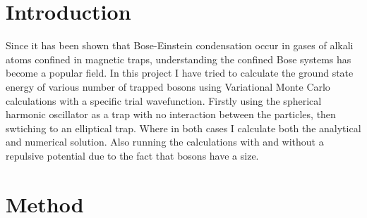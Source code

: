 \documentclass[12pt]{article}
\begin{document}
  \section{Introduction}
  Since it has been shown that Bose-Einstein condensation occur in gases of alkali 
  atoms confined in magnetic traps, understanding the confined Bose systems has 
  become a popular field. In this project I have tried to calculate the ground 
  state energy of various number of trapped bosons using Variational Monte Carlo 
  calculations with a specific trial wavefunction. Firstly using the spherical 
  harmonic oscillator as a trap with no interaction between the particles, then
  swtiching to an elliptical trap. Where in both cases I calculate both the 
  analytical and numerical solution. Also running the calculations with and 
  without a repulsive potential due to the fact that bosons have a size.

  \section{Method}
\end{document}
